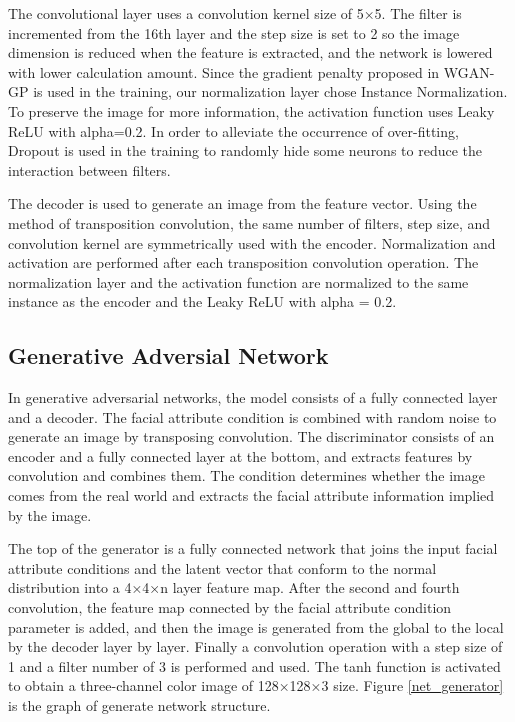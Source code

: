 The convolutional layer uses a convolution kernel size of 5×5.
The filter is incremented from the 16th layer and the step size is set to 2 so the image dimension is reduced when the feature is extracted,
    and the network is lowered with lower calculation amount.
Since the gradient penalty proposed in WGAN-GP is used in the training,
    our normalization layer chose Instance Normalization.
To preserve the image for more information, the activation function uses Leaky ReLU with alpha=0.2.
In order to alleviate the occurrence of over-fitting,
    Dropout is used in the training to randomly hide some neurons to reduce the interaction between filters.

The decoder is used to generate an image from the feature vector.
Using the method of transposition convolution, the same number of filters,
    step size, and convolution kernel are symmetrically used with the encoder.
Normalization and activation are performed after each transposition convolution operation.
The normalization layer and the activation function are normalized to the same instance as the encoder and the Leaky ReLU with alpha = 0.2.


\subsection{Generative Adversial Network}

In generative adversarial networks, the model consists of a fully connected layer and a decoder.
The facial attribute condition is combined with random noise to generate an image by transposing convolution.
The discriminator consists of an encoder and a fully connected layer at the bottom,
    and extracts features by convolution and combines them.
The condition determines whether the image comes from the real world and extracts the facial attribute information implied by the image.

The top of the generator is a fully connected network that joins the input facial attribute conditions and the latent vector that conform to the normal distribution into a 4×4×n layer feature map.
After the second and fourth convolution, the feature map connected by the facial attribute condition parameter is added,
    and then the image is generated from the global to the local by the decoder layer by layer.
Finally a convolution operation with a step size of 1 and a filter number of 3 is performed and used.
The tanh function is activated to obtain a three-channel color image of 128×128×3 size.
Figure \ref{net_generator} is the graph of generate network structure.

